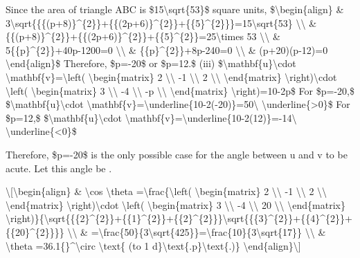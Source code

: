 Since the area of triangle ABC is \$15\textbackslash sqrt\{53\}\$
square units, \$\textbackslash begin\{align\} \& 3\textbackslash sqrt\{\{\{(p+8)\}\textasciicircum\{2\}\}+\{\{(2p+6)\}\textasciicircum\{2\}\}+\{\{5\}\textasciicircum\{2\}\}\}=15\textbackslash sqrt\{53\}
\textbackslash\textbackslash{} \& \{\{(p+8)\}\textasciicircum\{2\}\}+\{\{(2p+6)\}\textasciicircum\{2\}\}+\{\{5\}\textasciicircum\{2\}\}=25\textbackslash times
53 \textbackslash\textbackslash{} \& 5\{\{p\}\textasciicircum\{2\}\}+40p-1200=0
\textbackslash\textbackslash{} \& \{\{p\}\textasciicircum\{2\}\}+8p-240=0
\textbackslash\textbackslash{} \& (p+20)(p-12)=0 \textbackslash end\{align\}\$
Therefore, \$p=-20\$ or \$p=12.\$ \quad{} (iii) \$\textbackslash mathbf\{u\}\textbackslash cdot
\textbackslash mathbf\{v\}=\textbackslash left( \textbackslash begin\{matrix\}
2 \textbackslash\textbackslash{} -1 \textbackslash\textbackslash{}
2 \textbackslash\textbackslash{} \textbackslash end\{matrix\} \textbackslash right)\textbackslash cdot
\textbackslash left( \textbackslash begin\{matrix\} 3 \textbackslash\textbackslash{}
-4 \textbackslash\textbackslash{} -p \textbackslash\textbackslash{}
\textbackslash end\{matrix\} \textbackslash right)=10-2p\$ For \$p=-20,\$
\$\textbackslash mathbf\{u\}\textbackslash cdot \textbackslash mathbf\{v\}=\textbackslash underline\{10-2(-20)\}=50\textbackslash{}
\textbackslash underline\{>0\}\$ For \$p=12,\$ \$\textbackslash mathbf\{u\}\textbackslash cdot
\textbackslash mathbf\{v\}=\textbackslash underline\{10-2(12)\}=-14\textbackslash{}
\textbackslash underline\{<0\}\$

Therefore, \$p=-20\$ is the only possible case for the angle between
u and v to be acute. Let this angle be .

\textbackslash{[}\textbackslash begin\{align\} \& \textbackslash cos
\textbackslash theta =\textbackslash frac\{\textbackslash left(
\textbackslash begin\{matrix\} 2 \textbackslash\textbackslash{}
-1 \textbackslash\textbackslash{} 2 \textbackslash\textbackslash{}
\textbackslash end\{matrix\} \textbackslash right)\textbackslash cdot
\textbackslash left( \textbackslash begin\{matrix\} 3 \textbackslash\textbackslash{}
-4 \textbackslash\textbackslash{} 20 \textbackslash\textbackslash{}
\textbackslash end\{matrix\} \textbackslash right)\}\{\textbackslash sqrt\{\{\{2\}\textasciicircum\{2\}\}+\{\{1\}\textasciicircum\{2\}\}+\{\{2\}\textasciicircum\{2\}\}\}\textbackslash sqrt\{\{\{3\}\textasciicircum\{2\}\}+\{\{4\}\textasciicircum\{2\}\}+\{\{20\}\textasciicircum\{2\}\}\}\}
\textbackslash\textbackslash{} \& =\textbackslash frac\{50\}\{3\textbackslash sqrt\{425\}\}=\textbackslash frac\{10\}\{3\textbackslash sqrt\{17\}\}
\textbackslash\textbackslash{} \& \textbackslash theta =36.1\{\}\textasciicircum\textbackslash circ
\textbackslash text\{ (to 1 d\}\textbackslash text\{.p\}\textbackslash text\{.)\}
\textbackslash end\{align\}\textbackslash{]}